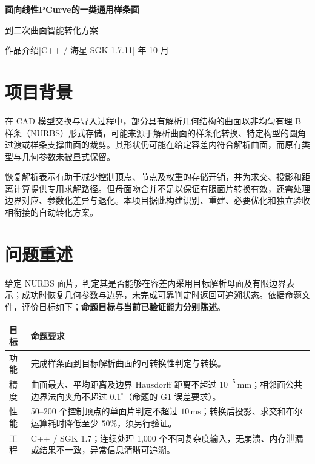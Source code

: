 \documentclass[UTF8,zihao=5,fontset=windows,a4paper]{ctexart}
\begin{document}
\thispagestyle{first}
\begin{center}
{\fontsize{19}{26}\selectfont\bfseries\color{ink}面向线性PCurve的一类通用样条面\par
到二次曲面智能转化方案\par}
\vspace{5pt}
{\small\color{muted}作品介绍\quad |\quad C++ / 海星 SGK 1.7.11\quad | 年 10 月}
\end{center}
\vspace{-6pt}
\section{项目背景}
在 CAD 模型交换与导入过程中，部分具有解析几何结构的曲面以非均匀有理 B 样条（NURBS）形式存储，可能来源于解析曲面的样条化转换、特定构型的圆角过渡或样条支撑曲面的裁剪。其形状仍可能在给定容差内符合解析曲面，而原有类型与几何参数未被显式保留。

恢复解析表示有助于减少控制顶点、节点及权重的存储开销，并为求交、投影和距离计算提供专用求解路径。但母面吻合并不足以保证有限面片转换有效，还需处理边界对应、参数化差异与退化。本项目据此构建识别、重建、必要优化和独立验收相衔接的自动转化方案。

\section{问题重述}
给定 NURBS 面片，判定其是否能够在容差内采用目标解析母面及有限边界表示；成功时恢复几何参数与边界，未完成可靠判定时返回可追溯状态。依据命题文件，评价目标如下；\textbf{命题目标与当前已验证能力分别陈述}。
\begin{center}\small
\renewcommand{\arraystretch}{1.14}
\begin{tabularx}{\linewidth}{@{}p{15mm}Y@{}}\toprule
目标 & 命题要求 \\\midrule
功能 & 完成样条面到目标解析曲面的可转换性判定与转换。\\
精度 & 曲面最大、平均距离及边界 Hausdorff 距离不超过 $10^{-5}\,\mathrm{mm}$；相邻面公共边界法向夹角不超过 $0.1^\circ$（命题的 G1 误差要求）。\\
性能 & 50--200 个控制顶点的单面片判定不超过 $10\,\mathrm{ms}$；转换后投影、求交和布尔运算耗时降低至少 $50\%$，须另行验证。\\
工程 & C++ / SGK 1.7；连续处理 1,000 个不同复杂度输入，无崩溃、内存泄漏或结果不一致，异常信息清晰可追溯。\\\bottomrule
\end{tabularx}
\end{center}
\end{document}
